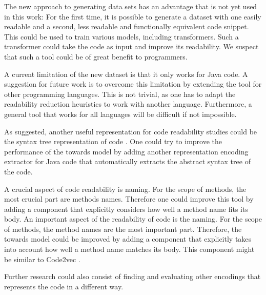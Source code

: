 \documentclass[%
class=scrreprt,
chapterprefix=false,%
open=right,%
twoside=false,%
paper=a4,%
logofile={Logo\_zentral\_farbig\_EN.png},%
thesistype=master,%
UKenglish,%
]{se2thesis}
\theoremstyle{definition}
\begin{document}
	The new approach to generating data sets has an advantage that is not yet used in this work: For the first time, it is possible to generate a dataset with one easily readable and a second, less readable and functionally equivalent code snippet. This could be used to train various models, including transformers. Such a transformer could take the code as input and improve its readability. We suspect that such a tool could be of great benefit to programmers.
	
	A current limitation of the new dataset is that it only works for Java code. A suggestion for future work is to overcome this limitation by extending the tool for other programming languages. This is not trivial, as one has to adapt the readability reduction heuristics to work with another language. Furthermore, a general tool that works for all languages will be difficult if not impossible.
	
	
	As \citeauthor{mi2023graph} suggested, another useful representation for code readability studies could be the syntax tree representation of code \cite{mi2023graph}. One could try to improve the performance of the towards model by adding another representation encoding extractor for Java code that automatically extracts the abstract syntax tree of the code.
	
	A crucial aspect of code readability is naming. For the scope of methods, the most crucial part are methods names. Therefore one could improve this tool by adding a component that explicitly considers how well a method name fits its body.
	An important aspect of the readability of code is the naming. For the scope of methods, the method names are the most important part. Therefore, the towards model could be improved by adding a component that explicitly takes into account how well a method name matches its body. This component might be similar to Code2vec \cite{alon2019code2vec}.
	
	Further research could also consist of finding and evaluating other encodings that represents the code in a different way.
	
\end{document}
